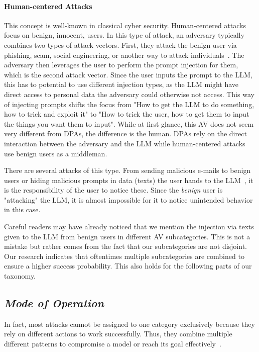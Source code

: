 \paragraph{Human-centered Attacks}
This concept is well-known in classical cyber security.
Human-centered attacks focus on benign, innocent, users.
In this type of attack, an adversary typically combines two types of attack vectors.
First, they attack the benign user via phishing, scam, social engineering, or another way to attack individuals~\cite{10.1145/3605764.3623985}.
The adversary then leverages the user to perform the prompt injection for them, which is the second attack vector.
Since the user inputs the prompt to the LLM, this has to potential to use different injection types, as the LLM might have direct access to personal data the adversary could otherwise not access.
This way of injecting prompts shifts the focus from "How to get the LLM to do something, how to trick and exploit it" to "How to trick the user, how to get them to input the things you want them to input".
While at first glance, this AV does not seem very different from DPAs, the difference is the human. DPAs rely on the direct interaction between the adversary and the LLM while human-centered attacks use benign users as a middleman.

There are several attacks of this type.
From sending malicious e-mails to benign users or hiding malicious prompts in data (texts) the user hands to the LLM~\cite{10.1145/3605764.3623985}, it is the responsibility of the user to notice these. 
Since the \textit{benign} user is "attacking" the LLM, it is almost impossible for it to notice unintended behavior in this case. 

Careful readers may have already noticed that we mention the injection via texts given to the LLM from benign users in different AV subcategories. 
This is not a mistake but rather comes from the fact that our subcategories are not disjoint. 
Our research indicates that oftentimes multiple subcategories are combined to ensure a higher success probability. 
This also holds for the following parts of our taxonomy.

\subsection{\textit{Mode of Operation}}

In fact, most attacks cannot be assigned to one category exclusively because they rely on different actions to work successfully. Thus, they combine multiple different patterns to compromise a model or reach its goal effectively~\cite{10.1145/3605764.3623985}.

